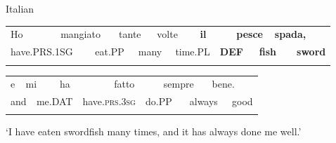 \begin{styleExLtrTblii}
Italian

\end{styleExLtrTblii}

\begin{tabular}{llllllllllllll}
\lsptoprule
Ho & \multicolumn{2}{l}{mangiato

} & \multicolumn{2}{l}{tante

} & \multicolumn{2}{l}{volte

} & \multicolumn{2}{l}{{\bfseries il}

} & \multicolumn{2}{l}{{\bfseries pesce}

} & \multicolumn{2}{l}{{\bfseries spada,}

} & \\
\multicolumn{2}{l}{have.PRS.1SG

} & \multicolumn{2}{l}{eat.PP

} & \multicolumn{2}{l}{many

} & \multicolumn{2}{l}{time.PL

} & \multicolumn{2}{l}{{\bfseries DEF}

} & \multicolumn{2}{l}{{\bfseries fish}

} & \multicolumn{2}{l}{{\bfseries sword}

}\\
\lspbottomrule
\end{tabular}

\begin{tabular}{llllllllllll}
\lsptoprule
e & \multicolumn{2}{l}{mi

} & \multicolumn{2}{l}{ha

} & \multicolumn{2}{l}{fatto

} & \multicolumn{2}{l}{sempre

} & \multicolumn{2}{l}{bene.

} & \\
\multicolumn{2}{l}{and

} & \multicolumn{2}{l}{me.DAT

} & \multicolumn{2}{l}{have.\textsc{prs.3sg}

} & \multicolumn{2}{l}{do.PP

} & \multicolumn{2}{l}{always

} & \multicolumn{2}{l}{good

}\\
\lspbottomrule
\end{tabular}

\begin{styleTranslation}
‘I have eaten swordfish many times, and it has always done me well.’

\end{styleTranslation}

